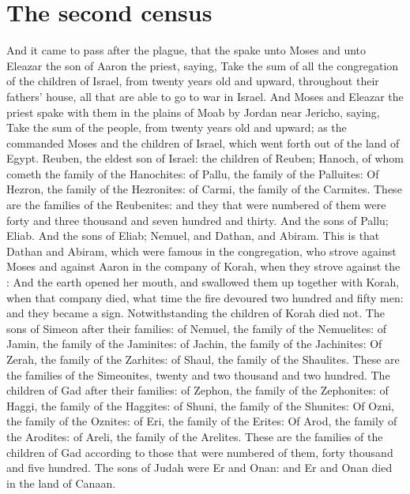 \section*{The second census}
\begin{biblechapter} %
\verse And it came to pass after the plague, that the \LORD spake unto Moses and unto Eleazar the son of Aaron the priest, saying,
\verse Take the sum of all the congregation of the children of Israel, from twenty years old and upward, throughout their fathers' house, all that are able to go to war in Israel.
\verse And Moses and Eleazar the priest spake with them in the plains of Moab by Jordan near Jericho, saying,
\verse Take the sum of the people, from twenty years old and upward; as the \LORD commanded Moses and the children of Israel, which went forth out of the land of Egypt.
\verse Reuben, the eldest son of Israel: the children of Reuben; Hanoch, of whom cometh the family of the Hanochites: of Pallu, the family of the Palluites:
\verse Of Hezron, the family of the Hezronites: of Carmi, the family of the Carmites.
\verse These are the families of the Reubenites: and they that were numbered of them were forty and three thousand and seven hundred and thirty.
\verse And the sons of Pallu; Eliab.
\verse And the sons of Eliab; Nemuel, and Dathan, and Abiram. This is that Dathan and Abiram, which were famous in the congregation, who strove against Moses and against Aaron in the company of Korah, when they strove against the \LORD:
\verse And the earth opened her mouth, and swallowed them up together with Korah, when that company died, what time the fire devoured two hundred and fifty men: and they became a sign.
\verse Notwithstanding the children of Korah died not.
\verse The sons of Simeon after their families: of Nemuel, the family of the Nemuelites: of Jamin, the family of the Jaminites: of Jachin, the family of the Jachinites:
\verse Of Zerah, the family of the Zarhites: of Shaul, the family of the Shaulites.
\verse These are the families of the Simeonites, twenty and two thousand and two hundred.
\verse The children of Gad after their families: of Zephon, the family of the Zephonites: of Haggi, the family of the Haggites: of Shuni, the family of the Shunites:
\verse Of Ozni, the family of the Oznites: of Eri, the family of the Erites:
\verse Of Arod, the family of the Arodites: of Areli, the family of the Arelites.
\verse These are the families of the children of Gad according to those that were numbered of them, forty thousand and five hundred.
\verse The sons of Judah were Er and Onan: and Er and Onan died in the land of Canaan.

\end{biblechapter}
